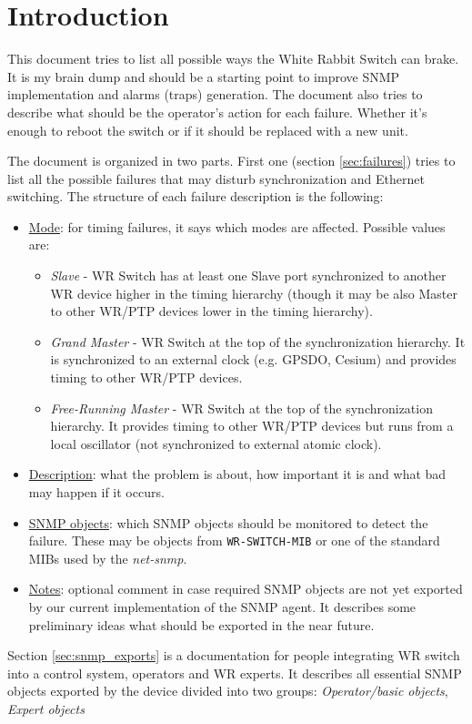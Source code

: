 \section{Introduction}

This document tries to list all possible ways the White Rabbit Switch can
brake. It is my brain dump and should be a starting point to improve SNMP
implementation and alarms (traps) generation. The document also tries to
describe what should be the operator's action for each failure. Whether it's
enough to reboot the switch or if it should be replaced with a new unit.

The document is organized in two parts. First one (section \ref{sec:failures})
tries to list all the possible failures that may disturb synchronization and
Ethernet switching. The structure of each failure description is the following:
\begin{itemize}[leftmargin=0pt]
	\item [] \underline{Mode}: for timing failures, it says which modes are
		affected. Possible values are:
		\begin{itemize}
			\item \emph{Slave} - WR Switch has at least one Slave port synchronized to
				another WR device higher in the timing hierarchy (though it may be also
				Master to other WR/PTP devices lower in the timing hierarchy).
			\item \emph{Grand Master} - WR Switch at the top of the synchronization
				hierarchy. It is synchronized to an external clock (e.g. GPSDO, Cesium)
				and provides timing to other WR/PTP devices.
			\item \emph{Free-Running Master} - WR Switch at the top of the
				synchronization hierarchy. It provides timing to other WR/PTP devices
				but runs from a local oscillator (not synchronized to external atomic
				clock).
		\end{itemize}

	\item [] \underline{Description}: what the problem is about, how important it
		is and what bad may happen if it occurs.
	\item [] \underline{SNMP objects}: which SNMP objects should be monitored to
		detect the failure. These may be objects from \texttt{WR-SWITCH-MIB} or one
		of the standard MIBs used by the \emph{net-snmp}.
	\item [] \underline{Notes}: optional comment in case required SNMP objects are
		not yet exported by our current implementation of the SNMP agent. It
		describes some preliminary ideas what should be exported in the near future.
\end{itemize}

Section \ref{sec:snmp_exports} is a documentation for people integrating WR
switch into a control system, operators and WR experts. It describes all
essential SNMP objects exported by the device divided into two groups:
\emph{Operator/basic objects}, \emph{Expert objects}

